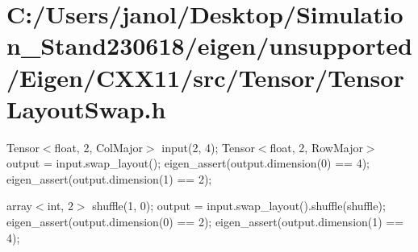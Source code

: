 \hypertarget{_c_1_2_users_2janol_2_desktop_2_simulation__stand230618_2eigen_2unsupported_2_eigen_2_c_x_x11_2s06653f9bdccfcd3e7238a71945c56e65}{}\section{C\+:/\+Users/janol/\+Desktop/\+Simulation\+\_\+\+Stand230618/eigen/unsupported/\+Eigen/\+C\+X\+X11/src/\+Tensor/\+Tensor\+Layout\+Swap.\+h}
Tensor$<$float, 2, Col\+Major$>$ input(2, 4); Tensor$<$float, 2, Row\+Major$>$ output = input.\+swap\+\_\+layout(); eigen\+\_\+assert(output.\+dimension(0) == 4); eigen\+\_\+assert(output.\+dimension(1) == 2);

array$<$int, 2$>$ shuffle(1, 0); output = input.\+swap\+\_\+layout().shuffle(shuffle); eigen\+\_\+assert(output.\+dimension(0) == 2); eigen\+\_\+assert(output.\+dimension(1) == 4);


